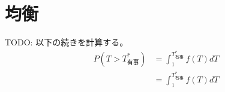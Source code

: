 \documentclass[main.tex]{subfiles}
\begin{document}
\section{均衡}



TODO: 以下の続きを計算する。
\begin{align*}
    P(T>T^*_{有事}) &= \int_1^{T^*_{有事}} f(T)dT\\
    &= \int_1^{T^*_{有事}} f(T)dT
\end{align*}
\end{document}
